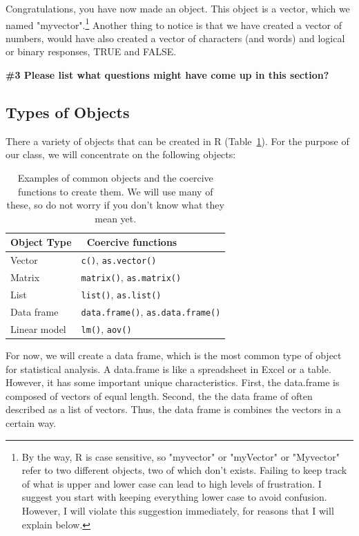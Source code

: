 \documentclass{tufte-handout}\usepackage[]{graphicx}\usepackage[]{xcolor}
\begin{document}
Congratulations, you have now made an object. This object is a vector, which we  named "myvector".\footnote{By the way, R is case sensitive, so "myvector" or "myVector" or "Myvector" refer to two different objects, two of which don't exists. Failing to keep track of what is upper and lower case can lead to high levels of frustration. I suggest you start with keeping everything lower case to avoid confusion. However, I will violate this suggestion immediately, for reasons that I will explain below.} Another thing to notice is that we have created a vector of numbers, would have also created a vector of characters (and words) and logical or binary responses, \ie TRUE and FALSE.

\bigskip
\noindent \textbf{\#3 Please list what questions might have come up in this section? }

\subsection{Types of Objects}

There a variety of objects that can be created in R (Table~\ref{tab:CommonObjects}). For the purpose of our class, we will concentrate on the following objects:
\begin{table}
	\centering
		\begin{tabular}{ll}
Object Type &\ Coercive functions \\
\hline
Vector & \texttt{c()}, \texttt{as.vector()} \\
Matrix & \texttt{matrix()}, \texttt{as.matrix()} \\
List & \texttt{list()}, \texttt{as.list()} \\
Data frame & \texttt{data.frame()}, \texttt{as.data.frame()} \\
Linear model & \texttt{lm()}, \texttt{aov()} \\\hline
		\end{tabular}
	\caption{Examples of common objects and the coercive functions to create them. We will use many of these, so do not worry if you don't know what they mean yet.}
	\label{tab:CommonObjects}
\end{table}

For now, we will create a data frame, which is the most common type of object for statistical analysis. A data.frame is like a spreadsheet in Excel or a table. However, it has some important unique characteristics. First, the data.frame is composed of vectors of equal length. Second, the the data frame of often described as a list of vectors. Thus, the data frame is combines the vectors in a certain way. 
\end{document}
